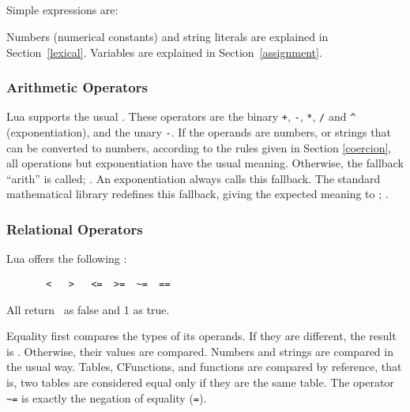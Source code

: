 \subsection{}

\subsubsection{}
Simple expressions are:
\begin{Produc}
\end{Produc}%
Numbers (numerical constants) and
string literals are explained in Section~\ref{lexical}.
Variables are explained in Section~\ref{assignment}.

\subsubsection{Arithmetic Operators}
Lua supports the usual .
These operators are the binary
\verb'+', \verb'-', \verb'*', \verb'/' and \verb'^' (exponentiation),
and the unary \verb'-'.
If the operands are numbers, or strings that can be converted to
numbers, according to the rules given in Section \ref{coercion},
all operations but exponentiation have the usual meaning.
Otherwise, the fallback ``arith'' is called; .
An exponentiation always calls this fallback.
The standard mathematical library redefines this fallback,
giving the expected meaning to ;
.

\subsubsection{Relational Operators}
Lua offers  the following :
\begin{verbatim}
       <   >   <=  >=  ~=  ==
\end{verbatim}
All return \nil\ as false and 1 as true.

Equality first compares the types of its operands.
If they are different, the result is \nil.
Otherwise, their values are compared.
Numbers and strings are compared in the usual way.
Tables, CFunctions, and functions are compared by reference,
that is, two tables are considered equal only if they are the same table.
The operator \verb'~=' is exactly the negation of equality (\verb'=').

